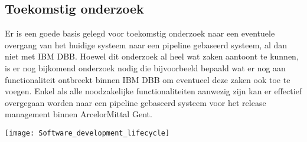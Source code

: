 \documentclass[a0,portrait]{hogent-poster}
\begin{document}
\begin{multicols}{2}
\section{Toekomstig onderzoek}

Er is een goede basis gelegd voor toekomstig onderzoek naar een eventuele overgang van het huidige systeem naar een pipeline gebaseerd systeem, al dan niet met IBM DBB. Hoewel dit onderzoek al heel wat zaken aantoont te kunnen, is er nog bijkomend onderzoek nodig die bijvoorbeeld bepaald wat er nog aan functionaliteit ontbreekt binnen IBM DBB om eventueel deze zaken ook toe te voegen. Enkel als alle noodzakelijke functionaliteiten aanwezig zijn kan er effectief overgegaan worden naar een pipeline gebaseerd systeem voor het release management binnen ArcelorMittal Gent. 
\begin{center}
    \captionsetup{type=figure}
    \texttt{[image: Software\_development\_lifecycle]}
    \label{fig:oud vs nieuw}
\end{center}

\end{multicols}
\end{document}
